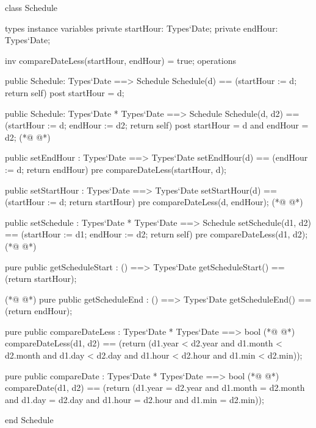 \begin{vdmpp}[breaklines=true]
class Schedule

types
instance variables
  private startHour: Types`Date;
  private endHour: Types`Date;
  
  inv compareDateLess(startHour, endHour) = true;
operations

 public Schedule: Types`Date ==> Schedule
  Schedule(d) == (startHour := d; return self)
 post startHour = d;
 
 public Schedule: Types`Date * Types`Date ==> Schedule
  Schedule(d, d2) == (startHour := d; endHour := d2; return self)
 post startHour = d and endHour = d2;
(*@
\label{Schedule:18}
@*)
 
 public setEndHour : Types`Date ==> Types`Date
  setEndHour(d) == (endHour := d; return endHour)
 pre compareDateLess(startHour, d);
  
 public setStartHour : Types`Date ==> Types`Date
  setStartHour(d) == (startHour := d; return startHour)
 pre compareDateLess(d, endHour);
(*@
\label{setEndHour:26}
@*)
 
 public setSchedule : Types`Date * Types`Date ==> Schedule
  setSchedule(d1, d2) == (startHour := d1; endHour := d2; return self)
 pre compareDateLess(d1, d2);
(*@
\label{setStartHour:30}
@*)
  
 pure public getScheduleStart : () ==> Types`Date
  getScheduleStart() == (return startHour);
  
(*@
\label{setSchedule:34}
@*)
 pure public getScheduleEnd : () ==> Types`Date
  getScheduleEnd() == (return endHour);
  
 pure public compareDateLess : Types`Date * Types`Date ==> bool
(*@
\label{getScheduleStart:38}
@*)
  compareDateLess(d1, d2) == (return (d1.year < d2.year and d1.month < d2.month and d1.day < d2.day and d1.hour < d2.hour and d1.min < d2.min));
  
 pure public compareDate : Types`Date * Types`Date ==> bool
(*@
\label{getScheduleEnd:41}
@*)
  compareDate(d1, d2) == (return (d1.year = d2.year and d1.month = d2.month and d1.day = d2.day and d1.hour = d2.hour and d1.min = d2.min));

end Schedule
\end{vdmpp}
